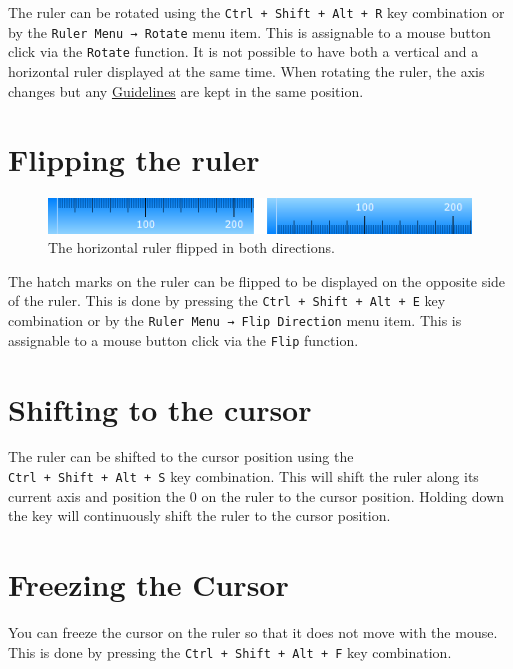 \documentclass[
]{book}
\begin{document}
The ruler can be rotated using the \texttt{Ctrl\ +\ Shift\ +\ Alt\ +\ R} key combination or by the \texttt{Ruler\ Menu\ →\ Rotate} menu item.
This is assignable to a mouse button click via the \texttt{Rotate} function.
It is not possible to have both a vertical and a horizontal ruler displayed at the same time.
When rotating the ruler, the axis changes but any \hyperref[guidelines]{Guidelines} are kept in the same position.

\section{Flipping the ruler}\label{flipping-the-ruler}

\begin{figure}
\centering
\includegraphics{images/ruler-flipped.png}
\caption{\label{fig:unnamed-chunk-2}The horizontal ruler flipped in both directions.}
\end{figure}

The hatch marks on the ruler can be flipped to be displayed on the opposite side of the ruler.
This is done by pressing the \texttt{Ctrl\ +\ Shift\ +\ Alt\ +\ E} key combination or by the \texttt{Ruler\ Menu\ →\ Flip\ Direction} menu item.
This is assignable to a mouse button click via the \texttt{Flip} function.

\section{Shifting to the cursor}\label{shifting-to-the-cursor}

The ruler can be shifted to the cursor position using the \texttt{Ctrl\ +\ Shift\ +\ Alt\ +\ S} key combination.
This will shift the ruler along its current axis and position the 0 on the ruler to the cursor position.
Holding down the key will continuously shift the ruler to the cursor position.

\section{Freezing the Cursor}\label{freezing-the-cursor}

You can freeze the cursor on the ruler so that it does not move with the mouse.
This is done by pressing the \texttt{Ctrl\ +\ Shift\ +\ Alt\ +\ F} key combination.
\end{document}
